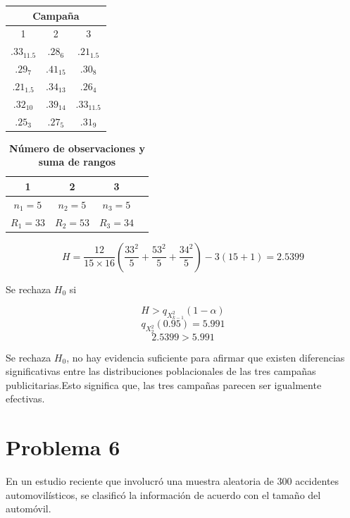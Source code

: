\documentclass{article}
\begin{document}
\begin{center}
    \begin{tabular}{c |c |c}
        \multicolumn{3}{c}{Campaña}              \\
        \hline
        1            & 2          & 3            \\
        $.33_{11.5}$ & $.28_{6}$  & $.21_{1.5}$  \\
        $.29_{7}$    & $.41_{15}$ & $.30_{8}$    \\
        $.21_{1.5}$  & $.34_{13}$ & $.26_{4}$    \\
        $.32_{10}$   & $.39_{14}$ & $.33_{11.5}$ \\
        $.25_{3}$    & $.27_{5}$  & $.31_{9}$    \\
    \end{tabular}
\end{center}

\begin{table}[ht]
    \centering
    \caption{\textbf{Número de observaciones y suma de rangos}}
    \begin{tabular}{cccc}
        \toprule
        1          & 2          & 3          \\
        \midrule
        $n_1 = 5$  & $n_2 = 5$  & $n_3 = 5$  \\
        $R_1 = 33$ & $R_2 = 53$ & $R_3 = 34$ \\
        \bottomrule
    \end{tabular}
\end{table}

\[ H = \frac{12}{15 \times 16} \left(\frac{33^2}{5} + \frac{53^2}{5} + \frac{34^2}{5} \right) - 3(15 + 1) = 2.5399 \]

Se rechaza $H_0$ si

\[H > q_{X^{2}_{k-1}}(1 - \alpha)\]
\[q_{X^{2}_{2}}(0.95) = 5.991\]
\[2.5399 > 5.991\]

Se rechaza \(H_0\), no hay evidencia suficiente para afirmar que existen diferencias significativas entre las distribuciones poblacionales de las tres campañas publicitarias.Esto significa que, las tres campañas parecen ser igualmente efectivas.

\section{Problema 6}
En un estudio reciente que involucró una muestra aleatoria de 300 accidentes automovilísticos, se clasificó la información de acuerdo con el tamaño del automóvil.
\end{document}
